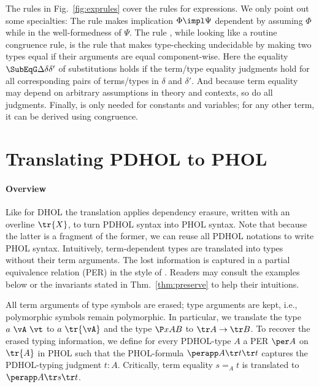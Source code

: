 The rules in Fig.~\ref{fig:exprules} cover the rules for expressions.
We only point out some specialties: The rule \Rtermimpl makes implication $\Phi\impl\Psi$ dependent by assuming $\Phi$ while in the well-formedness of $\Psi$.
The rule \Rteqsym, while looking like a routine congruence rule, is the rule that makes type-checking undecidable by making two types equal if their arguments are equal component-wise.
Here the equality $\SubEqG \Delta\delta{\delta'}$ of substitutions holds if the term/type equality judgments hold for all corresponding pairs of terms/types in $\delta$ and $\delta'$.
And because term equality may depend on arbitrary assumptions in theory and contexts, so do all judgments.
Finally, \Rtermteq is only needed for constants and variables; for any other term, it can be derived using congruence.

\section{Translating PDHOL to PHOL}\label{sec:trans}
\paragraph*{Overview}

Like for DHOL the translation applies dependency erasure,
written with an overline $\tr{X}$, to turn PDHOL syntax into PHOL syntax.
Note that because the latter is a fragment of the former, we can reuse all PDHOL notations to write PHOL
syntax.
Intuitively, term-dependent types are translated into types without their term arguments.
The lost information is captured in a partial equivalence relation (PER) in the style of \cite{persemantics}.
Readers may consult the examples below or the invariants stated in Thm.~\ref{thm:preserve} to help their intuitions.

All term arguments of type symbols are erased; type arguments are kept, i.e., polymorphic symbols remain polymorphic.
In particular, we translate the type $a\ \vA\ \vt$ to $a\ \tr{\vA}$ and the type $\P xAB$ to $\tr A\to \tr B$.
To recover the erased typing information, we define for every PDHOL-type $A$ a
PER $\per A$ on $\tr{A}$ in PHOL
such that the PHOL-formula $\perapp A {\tr t}{\tr t}$ captures the PDHOL-typing judgment $t:A$.
Critically, term equality \(s =_A t\) is translated to $\perapp A {\tr s}{\tr t}$.

